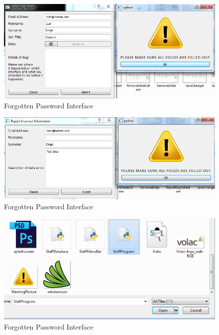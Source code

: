 \begin{figure}[H]
    \includegraphics[width=\textwidth]{./Testing/Images/ReportBugValidation.png}
    \caption{Forgotten Password Interface} \label{fig:ReportBugValidation}
\end{figure}

\begin{figure}[H]
    \includegraphics[width=\textwidth]{./Testing/Images/ReportErrorValidation.png}
    \caption{Forgotten Password Interface} \label{fig:ReportErrorValidation}
\end{figure}

\begin{figure}[H]
    \includegraphics[width=\textwidth]{./Testing/Images/IncorrectFile.png}
    \caption{Forgotten Password Interface} \label{fig:IncorrectFile}
\end{figure}

